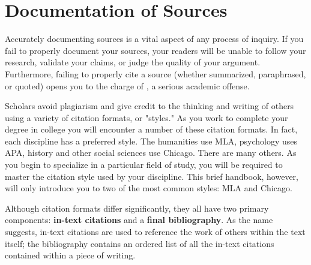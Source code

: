 
\hypertarget{citation}{}

\chapter{Documentation of Sources}

Accurately documenting sources is a vital aspect of any process of inquiry. If
you fail to  properly document your sources, your readers will be unable to
follow your research,  validate your claims, or judge the quality of your
argument. Furthermore, failing to  properly cite a source (whether summarized,
paraphrased, or quoted) opens you to the  charge of
\hyperlink{plagiarism}{\color{Ahrenge}{plagiarism}}, a serious academic offense.

Scholars avoid plagiarism and give credit to the thinking and writing of others
using a  variety of citation formats, or "styles." As you work to complete your
degree in college  you will encounter a number of these citation formats. In
fact, each discipline has a  preferred style. The humanities use MLA, psychology
uses APA, history and other social  sciences use Chicago. There are many others.
As you begin to specialize in a particular field of study, you will be required
to master the citation style used by your discipline.  This brief handbook,
however, will only introduce you to two of the most common styles: MLA and
Chicago.

Although citation formats differ significantly, they all have two primary
components:  \textbf{in-text citations} and a \textbf{final bibliography}. As
the name suggests, in-text  citations are used to reference the work of others
within the text itself; the  bibliography contains an ordered list of all the
in-text citations contained within a  piece of writing.


